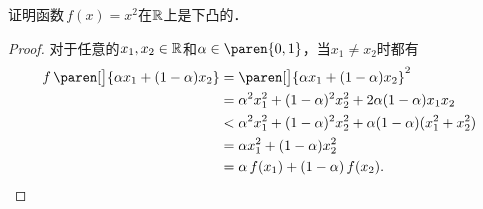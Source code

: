 \begin{example*}
  证明函数\(\,f(x) = x^2\)在\(\mathbb{R}\)上是下凸的．

  \begin{proof}
    对于任意的\(x_1, x_2 \in \mathbb{R}\)和\(\alpha \in \paren{0,1}\)，当\(x_1 \ne x_2\)时都有
    \[
      \begin{split}
        f\,\paren[\big]{\alpha x_1 + (1-\alpha) x_2}
        &= \paren[\big]{\alpha x_1 + (1-\alpha) x_2}^2 \\
        &= \alpha^2 x_1^2 + (1-\alpha)^2 x_2^2 + 2 \alpha (1-\alpha) x_1 x_2 \\
        &< \alpha^2 x_1^2 + (1-\alpha)^2 x_2^2 + \alpha (1-\alpha) (x_1^2 + x_2^2) \\
        &= \alpha x_1^2 + (1-\alpha) x_2^2 \\
        &= \alpha\,f(x_1) + (1-\alpha)\,f(x_2). \qedhere
      \end{split}
    \]
  \end{proof}
\end{example*}

